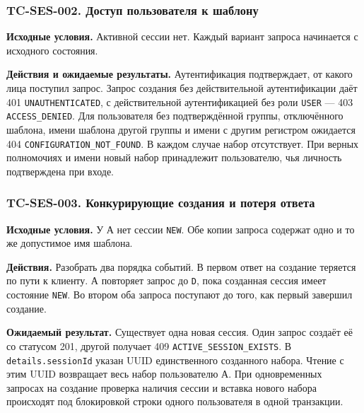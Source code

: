 \documentclass[12pt,a4paper]{article}
\begin{document}
\subsubsection{TC-SES-002. Доступ пользователя к шаблону}\label{tc-ses-002-ux434ux43eux441ux442ux443ux43f-ux43fux43eux43bux44cux437ux43eux432ux430ux442ux435ux43bux44f-ux43a-ux448ux430ux431ux43bux43eux43dux443}

\hypertarget{tc-ses-002-доступ-пользователя-к-шаблону}{}

\hypertarget{tc-ses-002}{}

\textbf{Исходные условия.} Активной сессии нет. Каждый вариант запроса начинается с исходного состояния.

\textbf{Действия и ожидаемые результаты.} Аутентификация подтверждает, от какого лица поступил запрос. Запрос создания без действительной аутентификации даёт 401 \texttt{UNAUTHENTICATED}, с действительной аутентификацией без роли \texttt{USER} --- 403 \texttt{ACCESS\_\allowbreak{}DENIED}. Для пользователя без подтверждённой группы, отключённого шаблона, имени шаблона другой группы и имени с другим регистром ожидается 404 \texttt{CONFIGURATION\_\allowbreak{}NOT\_\allowbreak{}FOUND}. В каждом случае набор отсутствует. При верных полномочиях и имени новый набор принадлежит пользователю, чья личность подтверждена при входе.

\subsubsection{TC-SES-003. Конкурирующие создания и потеря ответа}\label{tc-ses-003-ux43aux43eux43dux43aux443ux440ux438ux440ux443ux44eux449ux438ux435-ux441ux43eux437ux434ux430ux43dux438ux44f-ux438-ux43fux43eux442ux435ux440ux44f-ux43eux442ux432ux435ux442ux430}

\hypertarget{tc-ses-003-конкурирующие-создания-и-потеря-ответа}{}

\hypertarget{tc-ses-003}{}

\textbf{Исходные условия.} У А нет сессии \texttt{NEW}. Обе копии запроса содержат одно и то же допустимое имя шаблона.

\textbf{Действия.} Разобрать два порядка событий. В первом ответ на создание теряется по пути к клиенту. А повторяет запрос до \texttt{D}, пока созданная сессия имеет состояние \texttt{NEW}. Во втором оба запроса поступают до того, как первый завершил создание.

\textbf{Ожидаемый результат.} Существует одна новая сессия. Один запрос создаёт её со статусом 201, другой получает 409 \texttt{ACTIVE\_\allowbreak{}SESSION\_\allowbreak{}EXISTS}. В \texttt{details.\allowbreak{}session\allowbreak{}Id} указан UUID единственного созданного набора. Чтение с этим UUID возвращает весь набор пользователю А. При одновременных запросах на создание проверка наличия сессии и вставка нового набора происходят под блокировкой строки одного пользователя в одной транзакции.
\end{document}
